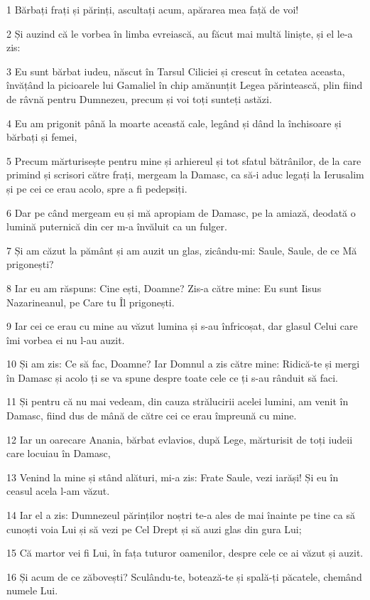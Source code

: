 \par 1 Bărbați frați și părinți, ascultați acum, apărarea mea față de voi!
\par 2 Și auzind că le vorbea în limba evreiască, au făcut mai multă liniște, și el le-a zis:
\par 3 Eu sunt bărbat iudeu, născut în Tarsul Ciliciei și crescut în cetatea aceasta, învățând la picioarele lui Gamaliel în chip amănunțit Legea părintească, plin fiind de râvnă pentru Dumnezeu, precum și voi toți sunteți astăzi.
\par 4 Eu am prigonit până la moarte această cale, legând și dând la închisoare și bărbați și femei,
\par 5 Precum mărturisește pentru mine și arhiereul și tot sfatul bătrânilor, de la care primind și scrisori către frați, mergeam la Damasc, ca să-i aduc legați la Ierusalim și pe cei ce erau acolo, spre a fi pedepsiți.
\par 6 Dar pe când mergeam eu și mă apropiam de Damasc, pe la amiază, deodată o lumină puternică din cer m-a învăluit ca un fulger.
\par 7 Și am căzut la pământ și am auzit un glas, zicându-mi: Saule, Saule, de ce Mă prigonești?
\par 8 Iar eu am răspuns: Cine ești, Doamne? Zis-a către mine: Eu sunt Iisus Nazarineanul, pe Care tu Îl prigonești.
\par 9 Iar cei ce erau cu mine au văzut lumina și s-au înfricoșat, dar glasul Celui care îmi vorbea ei nu l-au auzit.
\par 10 Și am zis: Ce să fac, Doamne? Iar Domnul a zis către mine: Ridică-te și mergi în Damasc și acolo ți se va spune despre toate cele ce ți s-au rânduit să faci.
\par 11 Și pentru că nu mai vedeam, din cauza strălucirii acelei lumini, am venit în Damasc, fiind dus de mână de către cei ce erau împreună cu mine.
\par 12 Iar un oarecare Anania, bărbat evlavios, după Lege, mărturisit de toți iudeii care locuiau în Damasc,
\par 13 Venind la mine și stând alături, mi-a zis: Frate Saule, vezi iarăși! Și eu în ceasul acela l-am văzut.
\par 14 Iar el a zis: Dumnezeul părinților noștri te-a ales de mai înainte pe tine ca să cunoști voia Lui și să vezi pe Cel Drept și să auzi glas din gura Lui;
\par 15 Că martor vei fi Lui, în fața tuturor oamenilor, despre cele ce ai văzut și auzit.
\par 16 Și acum de ce zăbovești? Sculându-te, botează-te și spală-ți păcatele, chemând numele Lui.
